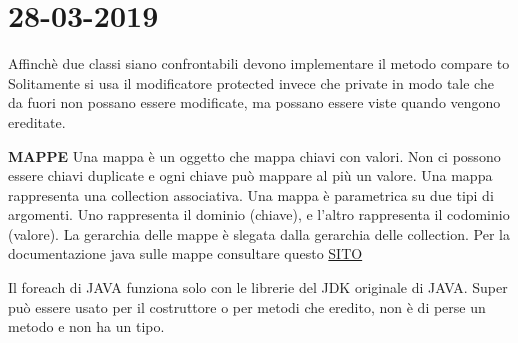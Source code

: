 

\newpage
\section{28-03-2019}
\noindent Affinchè due classi siano confrontabili devono implementare il metodo compare to \newline
Solitamente si usa il modificatore protected invece che private in modo tale che da fuori non possano essere modificate, ma possano essere viste quando vengono ereditate. \newline

\noindent \textbf{MAPPE}\newline
Una mappa è un oggetto che mappa chiavi con valori. Non ci possono essere chiavi duplicate e ogni chiave può mappare al più un valore. \newline
Una mappa rappresenta una collection associativa. \newline
Una mappa è parametrica su due tipi di argomenti. Uno rappresenta il dominio (chiave), e l'altro rappresenta il codominio (valore). La gerarchia delle mappe è slegata dalla gerarchia delle collection. \newline
Per la documentazione java sulle mappe consultare questo \href{https://docs.oracle.com/javase/8/docs/api/java/util/Map.html }{SITO}

\noindent Il foreach di JAVA funziona solo con le librerie del JDK originale di JAVA.\newline
Super può essere usato per il costruttore o per metodi che eredito, non è di perse un metodo e non ha un tipo.

 


